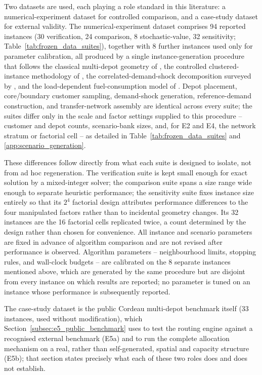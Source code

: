 \documentclass[authoryear,final,3p,times]{elsarticle}
\theoremstyle{definition}
\theoremstyle{plain}
\begin{document}
Two datasets are used, each playing a role standard in this literature: a numerical-experiment dataset for controlled comparison, and a case-study dataset for external validity.  The numerical-experiment dataset comprises 94 reported instances (30 verification, 24 comparison, 8 stochastic-value, 32 sensitivity; Table~\ref{tab:frozen_data_suites}), together with 8 further instances used only for parameter calibration, all produced by a single instance-generation procedure that follows the classical multi-depot geometry of \citet{cordeau1997vrp}, the controlled clustered-instance methodology of \citet{uchoa2017benchmark}, the correlated-demand-shock decomposition surveyed by \citet{gendreau1996stochastic}, and the load-dependent fuel-consumption model of \citet{bektas2011pollution}.  Depot placement, core/boundary customer sampling, demand-shock generation, reference-demand construction, and transfer-network assembly are identical across every suite; the suites differ only in the scale and factor settings supplied to this procedure -- customer and depot counts, scenario-bank sizes, and, for E2 and E4, the network stratum or factorial cell -- as detailed in Table~\ref{tab:frozen_data_suites} and \ref{app:scenario_generation}.

These differences follow directly from what each suite is designed to isolate, not from ad hoc regeneration.  The verification suite is kept small enough for exact solution by a mixed-integer solver; the comparison suite spans a size range wide enough to separate heuristic performance; the sensitivity suite fixes instance size entirely so that its $2^4$ factorial design attributes performance differences to the four manipulated factors rather than to incidental geometry changes.  Its 32 instances are the 16 factorial cells replicated twice, a count determined by the design rather than chosen for convenience.  All instance and scenario parameters are fixed in advance of algorithm comparison and are not revised after performance is observed.  Algorithm parameters -- neighbourhood limits, stopping rules, and wall-clock budgets -- are calibrated on the 8 separate instances mentioned above, which are generated by the same procedure but are disjoint from every instance on which results are reported; no parameter is tuned on an instance whose performance is subsequently reported.

The case-study dataset is the public Cordeau multi-depot benchmark itself \citep{cordeau1997vrp} (33 instances, used without modification), which Section~\ref{subsec:e5_public_benchmark} uses to test the routing engine against a recognised external benchmark (E5a) and to run the complete allocation mechanism on a real, rather than self-generated, spatial and capacity structure (E5b); that section states precisely what each of these two roles does and does not establish.
\end{document}
